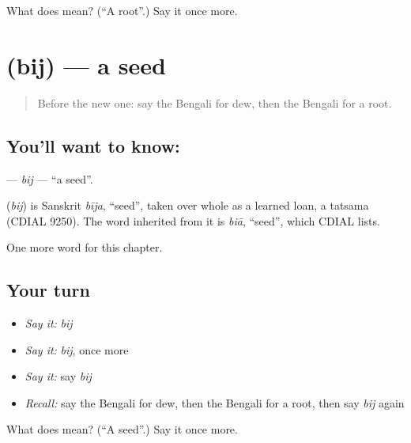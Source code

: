 \begin{tcolorbox}[breakable,colback=teal!4,colframe=teal!35!black,title={Before you move on}]
What does  mean? (\textquotedblleft{}A root\textquotedblright{}.) Say it once more.
\end{tcolorbox}
\section[\texorpdfstring{\bn{বীজ} (bij)}{বীজ (bij)}]{ (bij) — a seed}

\label{lesson:BN-C114-bij}



\begin{quote}
Before the new one: say the Bengali for dew, then the Bengali for a root.
\end{quote}

\subsection*{You'll want to know: }
\textbf{} — \emph{bij} — \textquotedblleft{}a seed\textquotedblright{}.

\begin{cousinweb}
\textbf{} (\emph{bij}) is Sanskrit \emph{bīja}, \textquotedblleft{}seed\textquotedblright{}, taken over whole as a learned loan, a tatsama (CDIAL 9250). The word inherited from it is \emph{biā}, \textquotedblleft{}seed\textquotedblright{}, which CDIAL lists.
\end{cousinweb}

\begin{grammarlens}[title={What you've built}]
One more word for this chapter.
\end{grammarlens}

\subsection*{Your turn}
\begin{itemize}
\raggedright
  \item \emph{Say it:} \emph{bij}
  \item \emph{Say it:} \emph{bij}, once more
  \item \emph{Say it:} say \emph{bij}
  \item \emph{Recall:} say the Bengali for dew, then the Bengali for a root, then say \emph{bij} again
\end{itemize}

\begin{tcolorbox}[breakable,colback=teal!4,colframe=teal!35!black,title={Before you move on}]
What does  mean? (\textquotedblleft{}A seed\textquotedblright{}.) Say it once more.
\end{tcolorbox}
